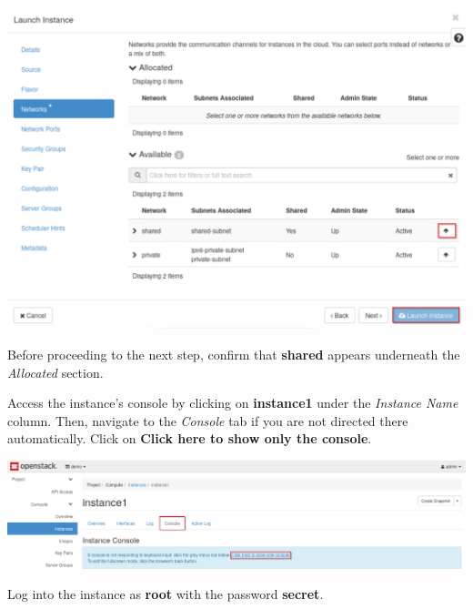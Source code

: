 \documentclass[letterpaper, 12pt]{article}
\begin{document}
\begin{enumerate}
\begin{labstep}
        \begin{center}
            \includegraphics[width=\linewidth]{images/part1/step8.png}
        \end{center}
    \end{labstep}

    \begin{stopbox}
        Before proceeding to the next step, confirm that \textbf{shared} appears underneath the \textit{Allocated} section.
    \end{stopbox}

    \begin{labstep}
        Access the instance's console by clicking on \textbf{instance1} under the \textit{Instance Name} column.
        Then, navigate to the \textit{Console} tab if you are not directed there automatically.
        Click on \textbf{Click here to show only the console}.

        \begin{center}
            \includegraphics[width=\linewidth]{images/part1/step9.png}
        \end{center}
    \end{labstep}

    \begin{labstep}
        Log into the instance as \textbf{root} with the password \textbf{secret}.


\end{labstep}
\end{enumerate}
\end{document}
